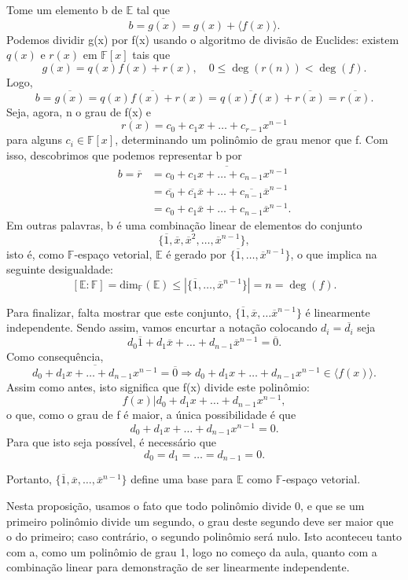 \documentclass[../algebraIII_notes.tex]{subfiles}
\begin{document}
\begin{proof*}
	Tome um elemento b de \(\mathbb{E}\) tal que
	\[
		b = \overline{g(x)} = g(x) + \langle f(x) \rangle.
	\]
	Podemos dividir g(x) por f(x) usando o algoritmo de divisão de Euclides: existem \(q(x)\) e \(r(x)\) em \(\mathbb{F}[x]\) tais que
	\[
		g(x) = q(x)f(x) + r(x),\quad 0\leq \deg{(r(n))} < \deg{(f)}.
	\]
	Logo,
	\[
		b = \overline{g(x)} = \overline{q(x)f(x) + r(x)} = \overline{q(x)f(x)} + \overline{r(x)} = \overline{r(x)}.
	\]
	Seja, agora, n o grau de f(x) e
	\[
		r(x) = c_{0} + c_{1}x + \dotsc + c_{r-1}x^{n-1}
	\]
	para alguns \(c_{i}\in \mathbb{F}[x]\), determinando um polinômio de grau menor que f. Com isso, descobrimos que podemos representar b por
	\begin{align*}
		b = \overline{r} & = \overline{c_{0}+ c_{1}x + \dotsc + c_{n-1}x^{n-1}}                                              \\
		                 & = \overline{c_{0}}+\overline{c_{1}}\overline{x} + \dotsc + \overline{c_{n-1}}\overline{x}^{n-1}   \\
		                 & = c_{0}+c_{1}\overline{x} + \dotsc + c_{n-1}\overline{x}^{n-1}                                  .
	\end{align*}
	Em outras palavras, b é uma combinação linear de elementos do conjunto
	\[
		\{\overline{1}, \overline{x}, \overline{x}^{2}, \dotsc , \overline{x}^{n-1}\},
	\]
	isto é, como \(\mathbb{F}\)-espaço vetorial, \(\mathbb{E}\) é gerado por \(\{\overline{1}, \dotsc , \overline{x}^{n-1}\}\), o que implica na seguinte desigualdade:
	\[
		[\mathbb{E}:\mathbb{F}] = \mathrm{dim}_{\mathbb{F}}(\mathbb{E})\leq |\{\overline{1}, \dotsc , \overline{x}^{n-1}\}| = n = \deg{(f)}.
	\]

	Para finalizar, falta mostrar que este conjunto, \(\{\overline{1}, \overline{x}, \dotsc \overline{x}^{n-1}\}\) é linearmente independente. Sendo assim, vamos encurtar a notação colocando \(d_{i}=\overline{d_{i}}\) seja
	\[
		d_{0}\overline{1} + d_{1}\overline{x} + \dotsc + d_{n-1}\overline{x}^{n-1} = \overline{0}.
	\]
	Como consequência,
	\[
		\overline{d_{0} + d_{1}x + \dotsc +d_{n-1}x^{n-1}} = \overline{0} \Rightarrow d_{0} + d_{1}x + \dotsc +d_{n-1}x^{n-1}\in \langle f(x) \rangle.
	\]
	Assim como antes, isto significa que f(x) divide este polinômio:
	\[
		f(x)|d_{0} + d_{1}x + \dotsc +d_{n-1}x^{n-1},
	\]
	o que, como o grau de f é maior, a única possibilidade é que
	\[
		d_{0} + d_{1}x + \dotsc +d_{n-1}x^{n-1} = 0.
	\]
	Para que isto seja possível, é necessário que
	\[
		d_{0} = d_{1} = \dotsc = d_{n-1} = 0.
	\]

	Portanto, \(\{\overline{1}, \overline{x}, \dotsc , \overline{x}^{n-1}\}\) define uma base para \(\mathbb{E}\) como \(\mathbb{F}\)-espaço vetorial.
\end{proof*}
Nesta proposição, usamos o fato que todo polinômio divide 0, e que se um primeiro polinômio divide um segundo, o grau deste segundo deve ser maior que o do primeiro; caso contrário, o segundo polinômio será nulo. Isto aconteceu tanto com a, como um polinômio de grau 1, logo no começo da aula, quanto com a combinação linear para demonstração de ser linearmente independente.
\end{document}
